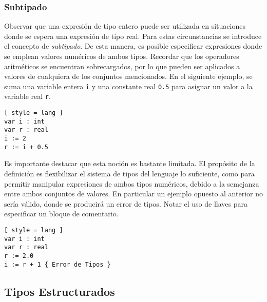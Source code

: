 \subsubsection{Subtipado}

Observar que una expresión de tipo entero puede ser utilizada en situaciones donde se espera una expresión de tipo real.
Para estas circunstancias se introduce el concepto de \textit{subtipado}.
De esta manera, es posible especificar expresiones donde se emplean valores numéricos de ambos tipos.
Recordar que los operadores aritméticos se encuentran sobrecargados, por lo que pueden ser aplicados a valores de cualquiera de los conjuntos mencionados.
En el siguiente ejemplo, se suma una variable entera \lstinline[style = lang]{i} y una constante real \lstinline[style = lang]{0.5} para asignar un valor a la variable real \lstinline[style = lang]{r}.

\begin{lstlisting}[ style = lang ]
var i : int
var r : real
i := 2
r := i + 0.5
\end{lstlisting}

Es importante destacar que esta noción es bastante limitada.
El propósito de la definición es flexibilizar el sistema de tipos del lenguaje lo suficiente, como para permitir manipular expresiones de ambos tipos numéricos, debido a la semejanza entre ambos conjuntos de valores.
En particular un ejemplo opuesto al anterior no sería válido, donde se producirá un error de tipos.
Notar el uso de llaves para especificar un bloque de comentario.

\begin{lstlisting}[ style = lang ]
var i : int
var r : real
r := 2.0
i := r + 1 { Error de Tipos }
\end{lstlisting}

\subsection{Tipos Estructurados}

